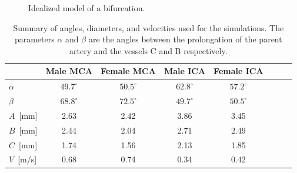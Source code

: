 \begin{figure}
  \begin{center}
  \end{center}
  \caption{Idealized model of a bifurcation.}
\end{figure}

\begin{table}
  \begin{center}
    \begin{tabular}{l*{6}{c}r}
      & Male MCA & Female MCA & Male ICA & Female ICA \\
      \hline
      $\alpha$	  & $49.7^\circ$ & $50.5^\circ$   & $62.8^\circ$ & $57.2^\circ$\\
$\beta$		  & $68.8^\circ$ & $72.5^\circ$   & $49.7^\circ$ & $50.5^\circ$\\
      $A$~[mm]		  & 2.63 & 2.42   & 3.86 & 3.45\\
      $B$~[mm]           & 2.44 & 2.04   & 2.71 & 2.49\\
      $C$~[mm] 	  & 1.74 & 1.56   & 2.13 & 1.85\\
      $V$~[m/s]	  & 0.68   & 0.74     & 0.34   & 0.42  \\
    \end{tabular}
    \caption{Summary of angles, diameters, and velocities used for the
      simulations. The parameters $\alpha$ and $\beta$ are the angles
      between the prolongation of the parent artery and the vessels C
      and B respectively.}
    \label{bcs}
  \end{center}
\end{table}

